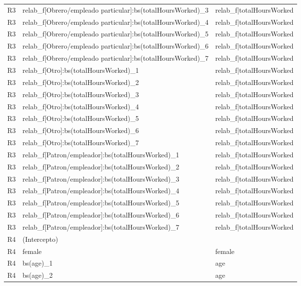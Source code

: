 \begin{longtable}{lll}
R3 & relab\_f[Obrero/empleado particular]:bs(totalHoursWorked)\_3 & relab\_f|totalHoursWorked \\
R3 & relab\_f[Obrero/empleado particular]:bs(totalHoursWorked)\_4 & relab\_f|totalHoursWorked \\
R3 & relab\_f[Obrero/empleado particular]:bs(totalHoursWorked)\_5 & relab\_f|totalHoursWorked \\
R3 & relab\_f[Obrero/empleado particular]:bs(totalHoursWorked)\_6 & relab\_f|totalHoursWorked \\
R3 & relab\_f[Obrero/empleado particular]:bs(totalHoursWorked)\_7 & relab\_f|totalHoursWorked \\
R3 & relab\_f[Otro]:bs(totalHoursWorked)\_1 & relab\_f|totalHoursWorked \\
R3 & relab\_f[Otro]:bs(totalHoursWorked)\_2 & relab\_f|totalHoursWorked \\
R3 & relab\_f[Otro]:bs(totalHoursWorked)\_3 & relab\_f|totalHoursWorked \\
R3 & relab\_f[Otro]:bs(totalHoursWorked)\_4 & relab\_f|totalHoursWorked \\
R3 & relab\_f[Otro]:bs(totalHoursWorked)\_5 & relab\_f|totalHoursWorked \\
R3 & relab\_f[Otro]:bs(totalHoursWorked)\_6 & relab\_f|totalHoursWorked \\
R3 & relab\_f[Otro]:bs(totalHoursWorked)\_7 & relab\_f|totalHoursWorked \\
R3 & relab\_f[Patron/empleador]:bs(totalHoursWorked)\_1 & relab\_f|totalHoursWorked \\
R3 & relab\_f[Patron/empleador]:bs(totalHoursWorked)\_2 & relab\_f|totalHoursWorked \\
R3 & relab\_f[Patron/empleador]:bs(totalHoursWorked)\_3 & relab\_f|totalHoursWorked \\
R3 & relab\_f[Patron/empleador]:bs(totalHoursWorked)\_4 & relab\_f|totalHoursWorked \\
R3 & relab\_f[Patron/empleador]:bs(totalHoursWorked)\_5 & relab\_f|totalHoursWorked \\
R3 & relab\_f[Patron/empleador]:bs(totalHoursWorked)\_6 & relab\_f|totalHoursWorked \\
R3 & relab\_f[Patron/empleador]:bs(totalHoursWorked)\_7 & relab\_f|totalHoursWorked \\
R4 & (Intercepto) &  \\
R4 & female & female \\
R4 & bs(age)\_1 & age \\
R4 & bs(age)\_2 & age \\

\end{longtable}
